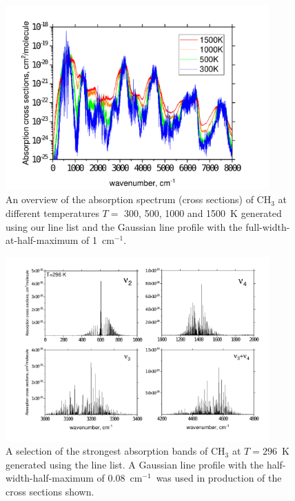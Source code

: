 \documentclass{achemso}
\newcommand{\3}{$_{3}$}
\newcommand{\cm}{cm$^{-1}$}
\begin{document}
\begin{figure}[h]
\begin{center}
\caption{\label{fig:overview} An overview of the absorption spectrum (cross sections) of CH$_3$ at different temperatures $T=$ 300, 500, 1000 and 1500~K generated using our line list and the Gaussian line profile with the full-width-at-half-maximum of 1~\cm.    }
\includegraphics[width=0.9\textwidth]{CH3_T.pdf}
\end{center}
\end{figure}



\begin{figure}[h]
\begin{center}
\caption{\label{fig:296K} A selection of the strongest absorption bands of CH$_3$ at $T=296$~K generated using the line list.  A Gaussian line profile with the half-width-half-maximum of 0.08~\cm\ was used in production of the cross sections shown.  }
\includegraphics[width=0.9\textwidth]{CH3_4bands.pdf}
\end{center}
\end{figure}
\end{document}
